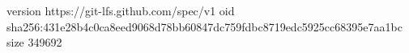 version https://git-lfs.github.com/spec/v1
oid sha256:431e28b4c0ca8eed9068d78bb60847dc759fdbc8719edc5925cc68395e7aa1bc
size 349692
